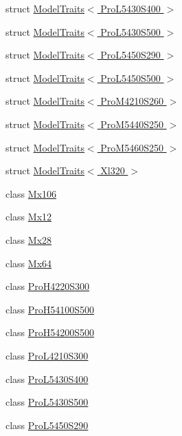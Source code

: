 \begin{DoxyCompactItemize}
\item 
struct \hyperlink{structdynamixel_1_1servos_1_1_model_traits_3_01_pro_l5430_s400_01_4}{Model\+Traits$<$ Pro\+L5430\+S400 $>$}
\item 
struct \hyperlink{structdynamixel_1_1servos_1_1_model_traits_3_01_pro_l5430_s500_01_4}{Model\+Traits$<$ Pro\+L5430\+S500 $>$}
\item 
struct \hyperlink{structdynamixel_1_1servos_1_1_model_traits_3_01_pro_l5450_s290_01_4}{Model\+Traits$<$ Pro\+L5450\+S290 $>$}
\item 
struct \hyperlink{structdynamixel_1_1servos_1_1_model_traits_3_01_pro_l5450_s500_01_4}{Model\+Traits$<$ Pro\+L5450\+S500 $>$}
\item 
struct \hyperlink{structdynamixel_1_1servos_1_1_model_traits_3_01_pro_m4210_s260_01_4}{Model\+Traits$<$ Pro\+M4210\+S260 $>$}
\item 
struct \hyperlink{structdynamixel_1_1servos_1_1_model_traits_3_01_pro_m5440_s250_01_4}{Model\+Traits$<$ Pro\+M5440\+S250 $>$}
\item 
struct \hyperlink{structdynamixel_1_1servos_1_1_model_traits_3_01_pro_m5460_s250_01_4}{Model\+Traits$<$ Pro\+M5460\+S250 $>$}
\item 
struct \hyperlink{structdynamixel_1_1servos_1_1_model_traits_3_01_xl320_01_4}{Model\+Traits$<$ Xl320 $>$}
\item 
class \hyperlink{classdynamixel_1_1servos_1_1_mx106}{Mx106}
\item 
class \hyperlink{classdynamixel_1_1servos_1_1_mx12}{Mx12}
\item 
class \hyperlink{classdynamixel_1_1servos_1_1_mx28}{Mx28}
\item 
class \hyperlink{classdynamixel_1_1servos_1_1_mx64}{Mx64}
\item 
class \hyperlink{classdynamixel_1_1servos_1_1_pro_h4220_s300}{Pro\+H4220\+S300}
\item 
class \hyperlink{classdynamixel_1_1servos_1_1_pro_h54100_s500}{Pro\+H54100\+S500}
\item 
class \hyperlink{classdynamixel_1_1servos_1_1_pro_h54200_s500}{Pro\+H54200\+S500}
\item 
class \hyperlink{classdynamixel_1_1servos_1_1_pro_l4210_s300}{Pro\+L4210\+S300}
\item 
class \hyperlink{classdynamixel_1_1servos_1_1_pro_l5430_s400}{Pro\+L5430\+S400}
\item 
class \hyperlink{classdynamixel_1_1servos_1_1_pro_l5430_s500}{Pro\+L5430\+S500}
\item 
class \hyperlink{classdynamixel_1_1servos_1_1_pro_l5450_s290}{Pro\+L5450\+S290}

\end{DoxyCompactItemize}
